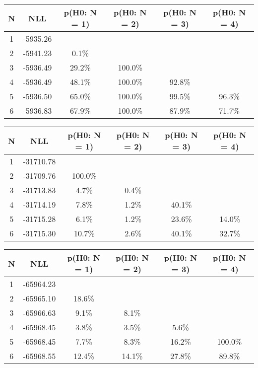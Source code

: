 \begin{table}[htb]
	\begin{center}
{\footnotesize\renewcommand{\arraystretch}{1.4}
		\begin{tabular}{cc||cccc}
			N & NLL & p(H0: N = 1) & p(H0: N = 2) & p(H0: N = 3) & p(H0: N = 4)\\ 
		\hline
1 & -5935.26 & & & & \\
2 & -5941.23 & 0.1\% & & & \\
3 & -5936.49 & 29.2\% & 100.0\% & & \\
4 & -5936.49 & 48.1\% & 100.0\% & 92.8\% & \\
5 & -5936.50 & 65.0\% & 100.0\% & 99.5\% & 96.3\% \\
6 & -5936.83 & 67.9\% & 100.0\% & 87.9\% & 71.7\% \\
	\end{tabular}
		\label{tab:lab}
	}
	\end{center}\end{table}

\begin{table}[htb]
	\begin{center}
{\footnotesize\renewcommand{\arraystretch}{1.4}
		\begin{tabular}{cc||cccc}
			N & NLL & p(H0: N = 1) & p(H0: N = 2) & p(H0: N = 3) & p(H0: N = 4)\\ 
		\hline
1 & -31710.78 & & & & \\
2 & -31709.76 & 100.0\% & & & \\
3 & -31713.83 & 4.7\% & 0.4\% & & \\
4 & -31714.19 & 7.8\% & 1.2\% & 40.1\% & \\
5 & -31715.28 & 6.1\% & 1.2\% & 23.6\% & 14.0\% \\
6 & -31715.30 & 10.7\% & 2.6\% & 40.1\% & 32.7\% \\
	\end{tabular}
		\label{tab:lab}
	}
	\end{center}\end{table}

\begin{table}[htb]
	\begin{center}
{\footnotesize\renewcommand{\arraystretch}{1.4}
		\begin{tabular}{cc||cccc}
			N & NLL & p(H0: N = 1) & p(H0: N = 2) & p(H0: N = 3) & p(H0: N = 4)\\ 
		\hline
1 & -65964.23 & & & & \\
2 & -65965.10 & 18.6\% & & & \\
3 & -65966.63 & 9.1\% & 8.1\% & & \\
4 & -65968.45 & 3.8\% & 3.5\% & 5.6\% & \\
5 & -65968.45 & 7.7\% & 8.3\% & 16.2\% & 100.0\% \\
6 & -65968.55 & 12.4\% & 14.1\% & 27.8\% & 89.8\% \\
	\end{tabular}
		\label{tab:lab}
	}
	\end{center}\end{table}

